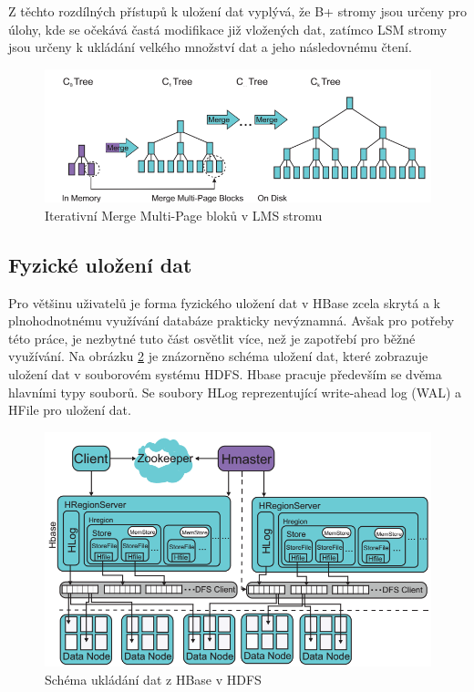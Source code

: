 \documentclass[thesis=M,czech]{FITthesis}[2012/06/26]
\begin{document}
Z těchto rozdílných přístupů k uložení dat vyplývá, že B+ stromy jsou určeny pro úlohy, kde se očekává častá modifikace již vložených dat, zatímco LSM stromy jsou určeny k ukládání velkého množství dat a jeho následovnému čtení.


\begin{figure}\centering
	\includegraphics[width=1\textwidth, angle=0]{files/lms}
	\caption[Iterativní Merge Multi-Page bloků v LMS stromu ]{Iterativní Merge Multi-Page bloků v LMS stromu }\label{fig:lms}
\end{figure}

\subsection{Fyzické uložení dat}	
Pro většinu uživatelů je forma fyzického uložení dat v HBase zcela skrytá a k plnohodnotnému využívání databáze prakticky nevýznamná. Avšak pro potřeby této práce, je nezbytné tuto část osvětlit více, než je zapotřebí pro běžné využívání. Na obrázku \ref{fig:hbasehdfs} je znázorněno schéma uložení dat, které zobrazuje uložení dat v souborovém systému HDFS. Hbase pracuje především se dvěma hlavními typy souborů. Se soubory HLog reprezentující write-ahead log (WAL) a HFile pro uložení dat.\cite{hbasecon}

\begin{figure}[h]\centering
	\includegraphics[width=1\textwidth, angle=0]{files/HBaseHDFS}
	\caption[Schéma ukládání dat z HBase v HDFS]{Schéma ukládání dat z HBase v HDFS}\label{fig:hbasehdfs}
\end{figure}
\end{document}
